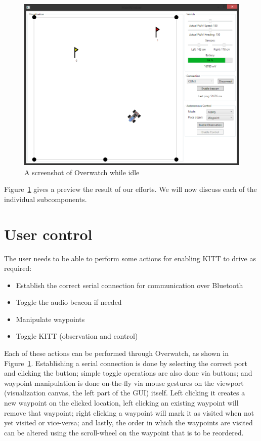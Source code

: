 \documentclass[11pt,titlepage]{report}
\begin{document}
\begin{figure}[H]
	\centering
	\includegraphics[width=\linewidth]{resource/overwatch-screenshot.png}
	\caption{A screenshot of Overwatch while idle}
	\label{fig:overwatch-screenshot}
\end{figure}

Figure~\ref{fig:overwatch-screenshot} gives a preview the result of our efforts. We will now discuss each of the individual subcomponents.

\section{User control}
The user needs to be able to perform some actions for enabling KITT to drive as required:

\begin{itemize}
	\item Establish the correct serial connection for communication over Bluetooth
	\item Toggle the audio beacon if needed
	\item Manipulate waypoints
	\item Toggle KITT (observation and control)
\end{itemize}

Each of these actions can be performed through Overwatch, as shown in Figure~\ref{fig:overwatch-screenshot}. Establishing a serial connection is done by selecting the correct port and clicking the button; simple toggle operations are also done via buttons; and waypoint manipulation is done on-the-fly via mouse gestures on the viewport (visualization canvas, the left part of the GUI) itself. Left clicking it creates a new waypoint on the clicked location, left clicking an existing waypoint will remove that waypoint; right clicking a waypoint will mark it as visited when not yet visited or vice-versa; and lastly, the order in which the waypoints are visited can be altered using the scroll-wheel on the waypoint that is to be reordered.
\end{document}
